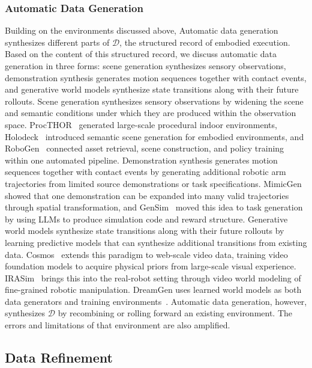 \documentclass[acmsmall,screen,review]{acmart}
\begin{document}
\subsubsection{Automatic Data Generation}\label{sec:auto_data_gen}

Building on the environments discussed above,
Automatic data generation synthesizes different parts of \(\mathcal{D}\), the structured record of embodied execution. 
Based on the content of this structured record,
we discuss automatic data generation in three forms: scene generation synthesizes sensory observations, 
demonstration synthesis generates motion sequences together with contact events, and generative world models synthesize state transitions along with their future rollouts.
Scene generation synthesizes sensory observations by widening the scene and semantic conditions under which they are produced within the observation space.
ProcTHOR~\cite{deitke2022procthor} generated large-scale procedural indoor environments, 
Holodeck~\cite{yang2024holodeck} introduced semantic scene generation for embodied environments,
and RoboGen~\cite{wang2024robogen} connected asset retrieval, scene construction, and policy training within one automated pipeline.
Demonstration synthesis generates motion sequences together with contact events by generating additional robotic arm trajectories from limited source demonstrations or task specifications.
MimicGen~\cite{mandlekar2023mimicgen} showed that one demonstration can be expanded into many valid trajectories through spatial transformation, 
and GenSim~\cite{wang2024gensim} moved this idea to task generation by using LLMs to produce simulation code and reward structure.
Generative world models synthesize state transitions along with their future rollouts by learning predictive models that can synthesize additional transitions from existing data.
Cosmos~\cite{nvidia2025cosmos} extends this paradigm to web-scale video data, training video foundation models to acquire physical priors from large-scale visual experience.
IRASim~\cite{zhu2025irasim} brings this into the real-robot setting through video world modeling of fine-grained robotic manipulation.
DreamGen uses learned world models as both data generators and training environments~\cite{jang2025dreamge}. 
Automatic data generation, however, synthesizes \(\mathcal{D}\) by recombining or rolling forward an existing environment. 
The errors and limitations of that environment are also amplified.

\subsection{Data Refinement}\label{sec:data_refinement}
\end{document}
